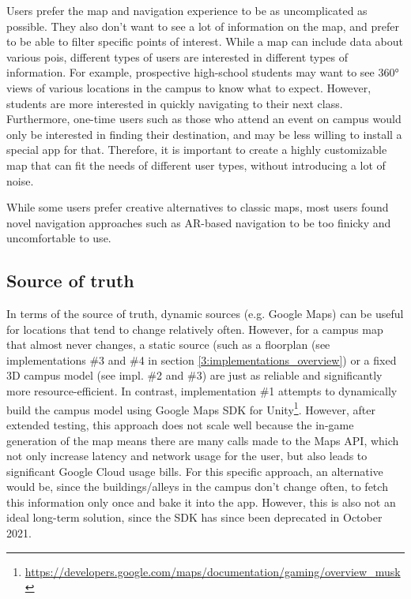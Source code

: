         Users prefer the map and navigation experience to be as uncomplicated as possible. They also don't want to see a lot of information on the map, and prefer to be able to filter specific points of interest. While a map can include data about various \acrshort{poi}s, different types of users are interested in different types of information. For example, prospective high-school students may want to see 360° views of various locations in the campus to know what to expect. However, students are more interested in quickly navigating to their next class. Furthermore, one-time users such as those who attend an event on campus would only be interested in finding their destination, and may be less willing to install a special app for that. Therefore, it is important to create a highly customizable map that can fit the needs of different user types, without introducing a lot of noise.
        
        While some users prefer creative alternatives to classic maps, most users found novel navigation approaches such as AR-based navigation to be too finicky and uncomfortable to use.
        
    \subsection{Source of truth}
    
        In terms of the source of truth, dynamic sources (e.g. Google Maps) can be useful for locations that tend to change relatively often. However, for a campus map that almost never changes, a static source (such as a floorplan (see implementations \#3 and \#4 in section \ref{3:implementations_overview}) or a fixed 3D campus model (see impl. \#2 and \#3) are just as reliable and significantly more resource-efficient. In contrast, implementation \#1 attempts to dynamically build the campus model using Google Maps SDK for Unity\footnote{\url{https://developers.google.com/maps/documentation/gaming/overview_musk}}. However, after extended testing, this approach does not scale well because the in-game generation of the map means there are many calls made to the Maps API, which not only increase latency and network usage for the user, but also leads to significant Google Cloud usage bills. For this specific approach, an alternative would be, since the buildings/alleys in the campus don’t change often, to fetch this information only once and bake it into the app. However, this is also not an ideal long-term solution, since the SDK has since been deprecated in October 2021.
    
